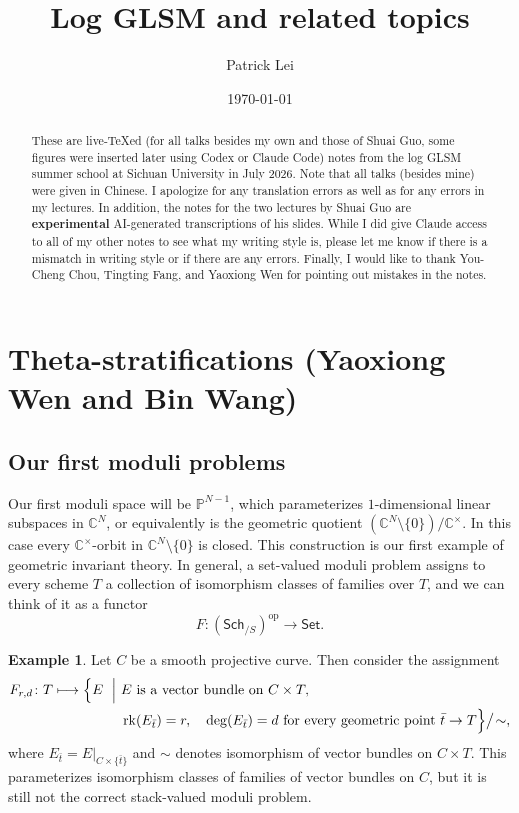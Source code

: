 \documentclass{amsart}
\title{Log GLSM and related topics}
\author{Patrick Lei}
\date{\today}
\theoremstyle{definition}
\newtheorem{exm}[thm]{Example}
\theoremstyle{remark}
\theoremstyle{plain}
\theoremstyle{definition}
\theoremstyle{remark}
\newcommand{\C}{\mathbb{C}}
\renewcommand{\P}{\mathbb{P}}
\newcommand{\mr}[1]{\mathrm{#1}}
\newcommand{\ms}[1]{\mathsf{#1}}
\newcommand{\1}{\mathbf{1}}
\newcommand{\2}{\mathbf{2}}
\newcommand{\3}{\mathbf{3}}
\begin{document}
    
\begin{abstract}
    These are live-TeXed (for all talks besides my own and those of Shuai Guo, some figures were inserted later using Codex or Claude Code) notes from the log GLSM summer school at Sichuan University in July 2026. Note that all talks (besides mine) were given in Chinese. I apologize for any translation errors as well as for any errors in my lectures. In addition, the notes for the two lectures by Shuai Guo are \textbf{experimental} AI-generated transcriptions of his slides. While I did give Claude access to all of my other notes to see what my writing style is, please let me know if there is a mismatch in writing style or if there are any errors. Finally, I would like to thank You-Cheng Chou, Tingting Fang, and Yaoxiong Wen for pointing out mistakes in the notes.
\end{abstract}

\maketitle

\tableofcontents

\section{Theta-stratifications (Yaoxiong Wen and Bin Wang)}%
\label{sec:Theta-stratifications}

\subsection{Our first moduli problems}%
\label{sub:Our first moduli problem}

Our first moduli space will be \(\P^{N-1}\), which parameterizes \(1\)-dimensional linear subspaces in \(\C^N\), or equivalently is the geometric quotient \((\C^N \setminus \{0\}) / \C^{\times}\). In this case every \(\C^{\times}\)-orbit in \(\C^N\setminus\{0\}\) is closed. This construction is our first example of geometric invariant theory. In general, a set-valued moduli problem assigns to every scheme \(T\) a collection of isomorphism classes of families over \(T\), and we can think of it as a functor
\[ F \colon (\ms{Sch}_{/S})^{\mr{op}} \to \ms{Set}. \]

\begin{exm}
    Let \(C\) be a smooth projective curve. Then consider the assignment
    \[
    \begin{aligned}
        F_{r,d}\colon T \longmapsto
        \Bigl\{
        E \ \Bigm|\ &
        E \text{ is a vector bundle on } C\times T,\\
        &\operatorname{rk}(E_{\bar t})=r,\quad \deg(E_{\bar t})=d
        \text{ for every geometric point } \bar t\to T
        \Bigr\}\big/\!\sim,
    \end{aligned}
    \]
    where \(E_{\bar t}=E|_{C\times\{\bar t\}}\) and \(\sim\) denotes isomorphism of vector bundles on \(C\times T\). This parameterizes isomorphism classes of families of vector bundles on \(C\), but it is still not the correct stack-valued moduli problem.
\end{exm}
\end{document}
